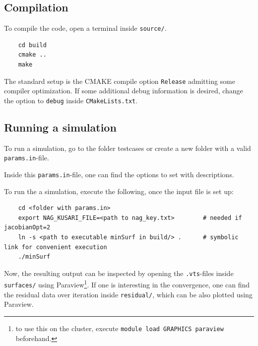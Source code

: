 \documentclass[11pt]{scrartcl}
\begin{document}
\subsection{Compilation}
To compile the code, open a terminal inside \texttt{source/}. 
\begin{lstlisting}
	cd build 
	cmake .. 
	make
\end{lstlisting}
The standard setup is the CMAKE compile option \texttt{Release} admitting some compiler optimization. If some additional debug information is desired, change the option to \texttt{debug} inside \texttt{CMakeLists.txt}.
\subsection{Running a simulation}
To run a simulation, go to the folder testcases or create a new folder with a valid \texttt{params.in}-file.

Inside this \texttt{params.in}-file, one can find the options to set with descriptions.

\noindent To run the a simulation, execute the following, once the input file is set up:
\begin{lstlisting}
	cd <folder with params.in> 
	export NAG_KUSARI_FILE=<path to nag_key.txt>        # needed if jacobianOpt=2 
	ln -s <path to executable minSurf in build/> .      # symbolic link for convenient execution 
	./minSurf
\end{lstlisting}
Now, the resulting output can be inspected by opening the \texttt{.vts}-files inside \texttt{surfaces/} using Paraview\footnote{to use this on the cluster, execute \texttt{module load GRAPHICS paraview} beforehand.}. If one is interesting in the convergence, one can find the residual data over iteration inside \texttt{residual/}, which can be also plotted using Paraview. 
\end{document}
